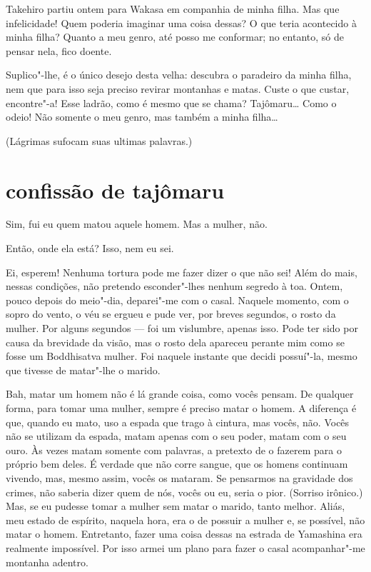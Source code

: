 Takehiro partiu ontem para Wakasa em companhia de minha filha. Mas que
infelicidade! Quem poderia imaginar uma coisa dessas? O que teria
acontecido à minha filha? Quanto a meu genro, até posso me conformar;
no entanto, só de pensar nela, fico doente.

Suplico"-lhe, é o único desejo desta velha: descubra o paradeiro da minha
filha, nem que para isso seja preciso revirar montanhas e matas. Custe
o que custar, encontre"-a! Esse ladrão, como é mesmo que se chama?
Tajômaru\ldots{} Como o odeio! Não somente o meu genro, mas também a minha
filha\ldots{}

(Lágrimas sufocam suas ultimas palavras.)

\section*{confissão de tajômaru}

Sim, fui eu quem matou aquele homem. Mas a mulher, não.

Então, onde ela está? Isso, nem eu sei.

Ei, esperem! Nenhuma tortura pode me fazer dizer o que não sei! Além do
mais, nessas condições, não pretendo esconder"-lhes nenhum segredo à
toa. Ontem, pouco depois do meio"-dia, deparei"-me com o casal. Naquele
momento, com o sopro do vento, o véu se ergueu e pude ver, por breves
segundos, o rosto da mulher. Por alguns segundos --- foi um vislumbre,
apenas isso. Pode ter sido por causa da brevidade da visão, mas o rosto
dela  apareceu perante mim como se fosse um Boddhisatva mulher. Foi
naquele instante que decidi possuí"-la, mesmo que tivesse de matar"-lhe o
marido.

Bah, matar um homem não é lá grande coisa, como vocês pensam. De
qualquer forma, para tomar uma mulher, sempre é preciso matar o homem.
A diferença é que, quando eu mato, uso a espada que trago à cintura,
mas vocês, não. Vocês não se utilizam da espada, matam apenas com o seu
poder, matam com o seu ouro. Às vezes matam somente com palavras, a
pretexto de o fazerem para o próprio bem deles. É verdade que não corre
sangue, que os homens continuam vivendo, mas, mesmo assim, vocês os
mataram. Se pensarmos na gravidade dos crimes, não saberia dizer quem
de nós, vocês ou eu, seria o pior. (Sorriso irônico.) Mas, se eu
pudesse tomar a mulher sem matar o marido, tanto melhor. Aliás, meu
estado de espírito, naquela hora, era o de possuir a mulher e, se
possível, não matar o homem. Entretanto, fazer uma coisa dessas na
estrada de Yamashina era realmente impossível. Por isso armei um plano
para fazer o casal acompanhar"-me montanha adentro.

